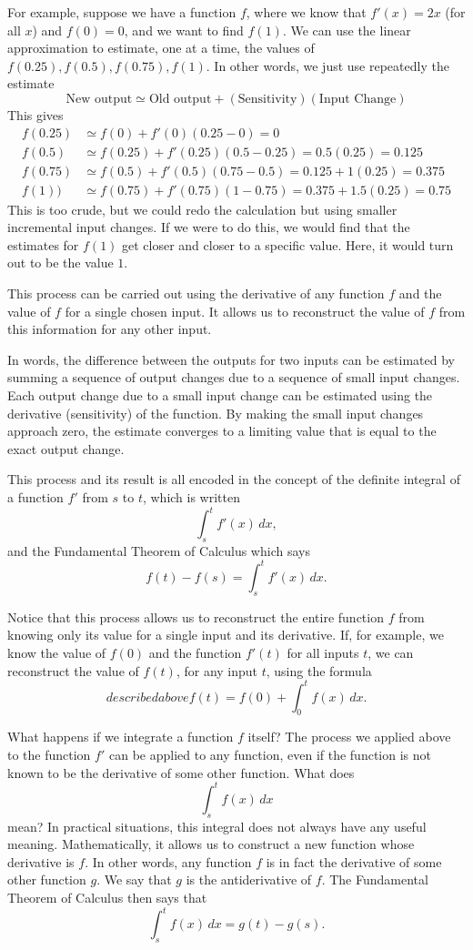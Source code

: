 \documentclass{math-deane}
\begin{document}
For example, suppose we have a function $f$, where we know that $f'(x) = 2x$ (for all $x$) and $f(0) = 0$, and we want to find $f(1)$. We can use the linear approximation to estimate, one at a time, the values of $f(0.25), f(0.5), f(0.75), f(1)$. In other words, we just use repeatedly the estimate
\[
\text{New output} \simeq \text{Old output} + (\text{Sensitivity})(\text{Input Change})
\]
This gives
\begin{align*}
f(0.25)	&\simeq f(0) + f'(0)(0.25-0) = 0\\
f(0.5) &\simeq f(0.25) + f'(0.25)(0.5-0.25) = 0.5(0.25) = 0.125\\
f(0.75) &\simeq f(0.5) + f'(0.5)(0.75-0.5) = 0.125 + 1(0.25) = 0.375\\
f(1)) &\simeq f(0.75) + f'(0.75)(1-0.75) = 0.375 + 1.5(0.25) = 0.75
\end{align*}
This is too crude, but we could redo the calculation but using smaller incremental input changes. If we were to do this, we would find that the estimates for $f(1)$ get closer and closer to a specific value. Here, it would turn out to be the value $1$.

This process can be carried out using the derivative of any function $f$ and the value of $f$ for a single chosen input. It allows us to reconstruct the value of $f$ from this information for any other input.

In words, the difference between the outputs for two inputs can be estimated by summing a sequence of output changes due to a sequence of small input changes. Each output change due to a small input change can be estimated using the derivative (sensitivity) of the function. By making the small input changes approach zero, the estimate converges to a limiting value that is equal to the exact output change.

This process and its result is all encoded in the concept of the definite integral of a function $f'$ from $s$ to $t$, which is written
\[ \int_s^t f'(x)\,dx, \]
and the Fundamental Theorem of Calculus which says
\[ f(t) - f(s) = \int_s^t f'(x)\,dx. \]

Notice that this process allows us to reconstruct the entire function $f$ from knowing only its value for a single input and its derivative. If, for example, we know the value of $f(0)$ and the function $f'(t)$ for all inputs $t$, we can reconstruct the value of $f(t)$, for any input $t$, using the formula
\[described above 
f(t) = f(0) + \int_0^t f(x)\,dx.
\]

What happens if we integrate a function $f$ itself? The process we applied above to the function $f'$ can be applied to any function, even if the function is not known to be the derivative of some other function. What does
\[
\int_s^t f(x)\,dx
\]
mean? In practical situations, this integral does not always have any useful meaning. Mathematically, it allows us to construct a new function whose derivative is $f$. In other words, any function $f$ is in fact the derivative of some other function $g$. We say that $g$ is the antiderivative of $f$. The Fundamental Theorem of Calculus then says that
\[
\int_s^t f(x)\,dx = g(t) - g(s).
\]
\end{document}
